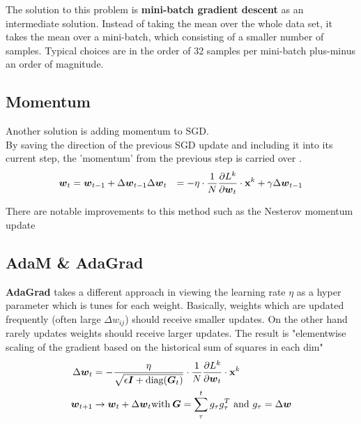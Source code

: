 The solution to this problem is \textbf{mini-batch gradient descent} as an intermediate solution.
Instead of taking the mean over the whole data set, it takes the mean over a mini-batch, which consisting of a smaller number of samples.
Typical choices are in the order of 32 samples per mini-batch plus-minus an order of magnitude.

\subsection{Momentum}
Another solution is adding momentum to SGD.\\
By saving the direction of the previous SGD update and including it into its current step, the 'momentum' from the previous step is carried over \cite{ommer}.
\begin{align}
    \boldsymbol{w}_t & = \boldsymbol{w}_{t-1} + \Delta \boldsymbol{w}_{t-1}
    \Delta \boldsymbol{w}_t & = - \eta \cdot \frac{1}{N} \frac{\partial L^k}{\partial \boldsymbol{w}_t} \cdot \mathbf{x}^k + \gamma \Delta \boldsymbol{w}_{t-1}\\
\end{align}

There are notable improvements to this method such as the Nesterov momentum update \cite{ommer}

\subsection{AdaM \& AdaGrad}
\textbf{AdaGrad} takes a different approach in viewing the learning rate $\eta$ as a hyper parameter which is tunes for each weight.
Basically, weights which are updated frequently (often large $\Delta w_{ij}$) should receive smaller updates.
On the other hand rarely updates weights should receive larger updates.
The result is "elementwise scaling of the gradient based on the historical sum of squares in each dim" \cite{ommer}
\begin{align}
    \Delta \boldsymbol{w}_t & = - \frac{\eta}{\sqrt{\epsilon \boldsymbol{I} + \text{diag}(\boldsymbol{G}_t)}} \cdot \frac{1}{N} \frac{\partial L^k}{\partial \boldsymbol{w}_t} \cdot \mathbf{x}^k \\
    \boldsymbol{w}_{t+1} & \rightarrow \boldsymbol{w}_t + \Delta \boldsymbol{w}_t
    \text{with} \: \boldsymbol{G} = \sum_{\tau}^{t} g_\tau g_\tau^T \text{ and } g_\tau = \Delta \boldsymbol{w}
\end{align}

